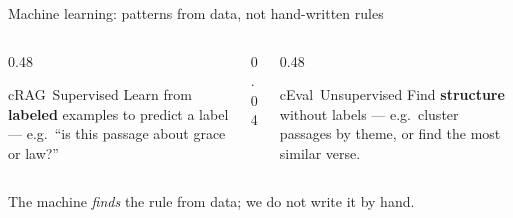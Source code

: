 \begin{frame}{Machine learning: patterns from data, not hand-written rules}
  \begin{center}
  \end{center}
  \vspace{6pt}
  \begin{columns}[t,totalwidth=\textwidth]
    \begin{column}{0.48\textwidth}
      \begin{featbox}{cRAG}{\faTags\ Supervised}
        \scriptsize Learn from \textbf{labeled} examples to predict a label ---
        e.g.\ ``is this passage about grace or law?''
      \end{featbox}
    \end{column}
    \begin{column}{0.04\textwidth}\end{column}
    \begin{column}{0.48\textwidth}
      \begin{featbox}{cEval}{\faObjectGroup\ Unsupervised}
        \scriptsize Find \textbf{structure} without labels --- e.g.\ cluster
        passages by theme, or find the most similar verse.
      \end{featbox}
    \end{column}
  \end{columns}
  \vspace{8pt}
  \begin{center}\small\color{midgray}The machine \emph{finds} the rule from data; we do not write it by hand.\end{center}
\end{frame}

